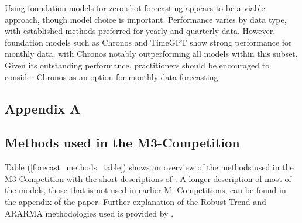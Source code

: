 \documentclass[12pt,a4paper]{article}
\begin{document}
Using foundation models for zero-shot forecasting appears to be a viable approach, though model choice is important. Performance varies by data type, with established methods preferred for yearly and quarterly data. However, foundation models such as Chronos and TimeGPT show strong performance for monthly data, with Chronos notably outperforming all models within this subset. Given its outstanding performance, practitioners should be encouraged to consider Chronos as an option for monthly data forecasting. 


\newpage
\printbibliography{}

\newpage
\begin{center}
\item  \section*{Appendix A} \label{appendix_a}
\end{center}



\begin{center}
  \item  \subsection*{Methods used in the M3-Competition}
\end{center}

Table (\ref{forecast_methods_table}) shows an overview of the methods used in the M3 Competition with the short descriptions of \cite{MAKRIDAKIS2000}. A longer description of most of the models, those that is not used in earlier M- Competitions, can be found in the appendix of the paper. Further explanation of the Robust-Trend and ARARMA methodologies used is provided by \cite{Meade2000}.
\end{document}
